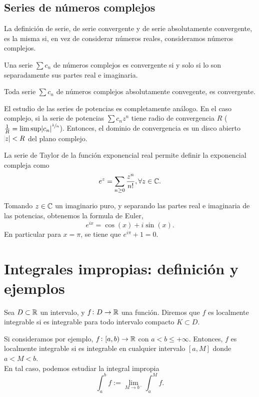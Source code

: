 \subsection{Series de números complejos}

\begin{defi*}
    La definición de serie, de serie convergente y de serie absolutamente convergente,
    es la misma si, en vez de considerar números reales, consideramos números
    complejos.
\end{defi*}

\begin{prop}
    Una serie $\sum c_n$ de números complejos es convergente si y solo si lo son
    separadamente sus partes real e imaginaria.
\end{prop}

\begin{prop}
    Toda serie $\sum c_n$ de números complejos absolutamente convegente, es
    convergente.
\end{prop}

\begin{obs}
    El estudio de las series de potencias es completamente análogo. En el caso
    complejo, si la serie de potencias $\sum c_n z^n$ tiene radio de convergencia
    $R$ ($\frac{1}{R} = \limsup \abs{c_n}^{\sfrac{1}{n}}$). Entonces, el dominio de
    convergencia es un disco abierto $\abs{z} < R$ del plano complejo.
\end{obs}

\begin{obs}
    La serie de Taylor de la función exponencial real permite definir la exponencial
    compleja como
    \[
        e^z = \sum_{n \geq 0} \frac{z^n}{n!}, \forall z \in \mathbb{C}.
    \]
\end{obs}

\begin{prop}
    Tomando $z \in \mathbb{C}$ un imaginario puro, y separando las partes real e imaginaria
    de las potencias, obtenemos la formula de Euler,
    \[
        e^{ix} = \cos(x) + i\sin(x).
    \]
    En particular para $x = \pi$, se tiene que $e^{i\pi} + 1 = 0$.
\end{prop}



\section{Integrales impropias: definición y ejemplos}

\begin{defi}
    Sea $D \subset \mathbb{R}$ un intervalo, y $f \colon D \to \mathbb{R}$ una función.
    Diremos que $f$ es localmente integrable si es integrable para todo intervalo
    compacto $K \subset D$.
\end{defi}
\begin{obs}
    Si consideramos por ejemplo, $f \colon [a,b) \to \mathbb{R}$ con $a < b \leq +\infty$.
    Entonces, $f$ es localmente integrable si es integrable en cualquier intervalo
    $[a,M]$ donde $a < M < b$. \\
    En tal caso, podemos estudiar la integral impropia
    \[
        \int_a^b f := \lim_{M \to b^-} \int^M_a f.
    \]
\end{obs}

